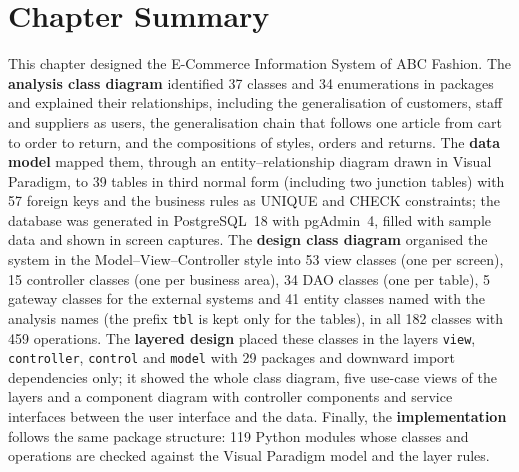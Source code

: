 \section{Chapter Summary}
This chapter designed the E-Commerce Information System of ABC Fashion. The \textbf{analysis class diagram} identified 37 classes and 34 enumerations in packages and explained their relationships, including the generalisation of customers, staff and suppliers as users, the generalisation chain that follows one article from cart to order to return, and the compositions of styles, orders and returns. The \textbf{data model} mapped them, through an entity--relationship diagram drawn in Visual Paradigm, to 39 tables in third normal form (including two junction tables) with 57 foreign keys and the business rules as UNIQUE and CHECK constraints; the database was generated in PostgreSQL~18 with pgAdmin~4, filled with sample data and shown in screen captures. The \textbf{design class diagram} organised the system in the Model--View--Controller style into 53 view classes (one per screen), 15 controller classes (one per business area), 34 DAO classes (one per table), 5 gateway classes for the external systems and 41 entity classes named with the analysis names (the prefix \texttt{tbl} is kept only for the tables), in all 182 classes with 459 operations. The \textbf{layered design} placed these classes in the layers \texttt{view}, \texttt{controller}, \texttt{control} and \texttt{model} with 29 packages and downward \guillemotleft import\guillemotright{} dependencies only; it showed the whole class diagram, five use-case views of the layers and a component diagram with controller components and service interfaces between the user interface and the data. Finally, the \textbf{implementation} follows the same package structure: 119 Python modules whose classes and operations are checked against the Visual Paradigm model and the layer rules.
\fussy
